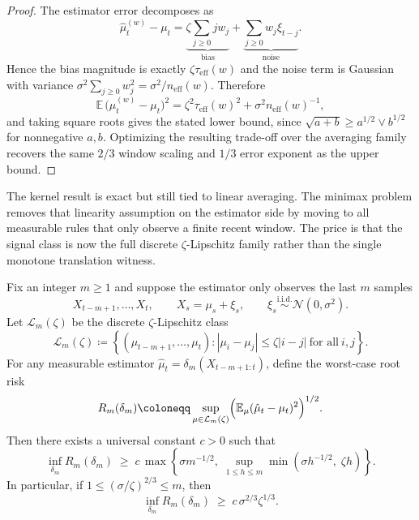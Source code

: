 \begin{proof}
The estimator error decomposes as
\[
  \hat\mu_t^{(w)} - \mu_t
  = \underbrace{\zeta\sum_{j\geq 0} j w_j}_{\text{bias}}
    + \underbrace{\sum_{j\geq 0} w_j \xi_{t-j}}_{\text{noise}}.
\]
Hence the bias magnitude is exactly $\zeta\tau_{\mathrm{eff}}(w)$ and the noise
term is Gaussian with variance $\sigma^2\sum_{j\geq 0}w_j^2 = \sigma^2 /
n_{\mathrm{eff}}(w)$. Therefore
\[
  \mathbb{E}\,\bigl(\hat\mu_t^{(w)} - \mu_t\bigr)^2
  = \zeta^2 \tau_{\mathrm{eff}}(w)^2 + \sigma^2 n_{\mathrm{eff}}(w)^{-1},
\]
and taking square roots gives the stated lower bound, since
\(\sqrt{a+b} \geq a^{1/2} \vee b^{1/2}\) for nonnegative $a,b$.
Optimizing the resulting trade-off over the averaging family recovers the same
$2/3$ window scaling and $1/3$ error exponent as the upper bound.
\end{proof}

The kernel result is exact but still tied to linear averaging. The minimax
problem removes that linearity assumption on the estimator side by moving to all
measurable rules that only observe a finite recent window. The price is that the
signal class is now the full discrete
$\zeta$-Lipschitz family rather than the single monotone translation witness.

\begin{proposition}
\label{prop:window_minimax}
Fix an integer $m \geq 1$ and suppose the estimator only observes the last $m$
samples
\[
  X_{t-m+1},\dots,X_t,
  \qquad
  X_s = \mu_s + \xi_s,
  \qquad
  \xi_s \stackrel{\mathrm{i.i.d.}}{\sim} \mathcal{N}(0,\sigma^2).
\]
Let $\mathcal{L}_m(\zeta)$ be the discrete $\zeta$-Lipschitz class
\[
  \mathcal{L}_m(\zeta)
  \coloneqq
  \left\{(\mu_{t-m+1},\dots,\mu_t):
    |\mu_i-\mu_j| \leq \zeta |i-j|\ \text{for all}\ i,j
  \right\}.
\]
For any measurable estimator $\hat\mu_t = \delta_m(X_{t-m+1:t})$, define the
worst-case root risk
\[
  R_m(\delta_m)
  \coloneqq
  \sup_{\mu \in \mathcal{L}_m(\zeta)}
  \Bigl(\mathbb{E}_\mu (\hat\mu_t - \mu_t)^2\Bigr)^{1/2}.
\]
Then there exists a universal constant $c>0$ such that
\[
  \inf_{\delta_m} R_m(\delta_m)
  \;\geq\;
  c\,\max\!\left\{
    \sigma m^{-1/2},\;
    \sup_{1\leq h\leq m}\min\!\left(\sigma h^{-1/2},\; \zeta h\right)
  \right\}.
\]
In particular, if $1 \leq (\sigma/\zeta)^{2/3} \leq m$, then
\[
  \inf_{\delta_m} R_m(\delta_m)
  \;\geq\;
  c\,\sigma^{2/3}\zeta^{1/3}.
\]
\end{proposition}

